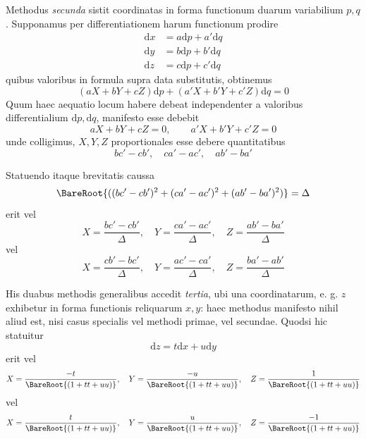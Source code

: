 \par\indent{}%
Methodus \textit{secunda} sistit coordinatas in forma functionum duarum variabilium \(p,q\). Supponamus per differentiationem harum functionum prodire
\[
\begin{aligned}
\mathrm{d}x&=a\mathrm{d}p+a'\mathrm{d}q\\
\mathrm{d}y&=b\mathrm{d}p+b'\mathrm{d}q\\
\mathrm{d}z&=c\mathrm{d}p+c'\mathrm{d}q
\end{aligned}
\]
\noindent quibus valoribus in formula supra data substitutis, obtinemus
\[
(aX+bY+cZ)\mathrm{d}p+(a'X+b'Y+c'Z)\mathrm{d}q=0
\]
\noindent Quum haec aequatio locum habere debeat independenter a valoribus differentialium \(\mathrm{d}p,\mathrm{d}q\), manifesto esse debebit
\[
aX+bY+cZ=0,\qquad a'X+b'Y+c'Z=0
\]
\noindent unde colligimus, \(X,Y,Z\) proportionales esse debere quantitatibus
\[
bc'-cb',\quad ca'-ac',\quad ab'-ba'
\]
\par\indent Statuendo itaque brevitatis caussa
\[
\BareRoot{((bc'-cb')^2+(ca'-ac')^2+(ab'-ba')^2)}=\Delta
\]
\noindent erit vel
\[
X=\frac{bc'-cb'}{\Delta},\quad Y=\frac{ca'-ac'}{\Delta},\quad Z=\frac{ab'-ba'}{\Delta}
\]
\noindent vel
\[
X=\frac{cb'-bc'}{\Delta},\quad Y=\frac{ac'-ca'}{\Delta},\quad Z=\frac{ba'-ab'}{\Delta}
\]
\par\indent His duabus methodis generalibus accedit \textit{tertia}, ubi una coordinatarum, e. g. \(z\) exhibetur in forma functionis reliquarum \(x,y\): haec methodus manifesto nihil aliud est, nisi casus specialis vel methodi primae, vel secundae. Quodsi hic statuitur
\[
\mathrm{d}z=t\mathrm{d}x+u\mathrm{d}y
\]
\noindent erit vel
\[
X=\frac{-t}{\BareRoot{(1+tt+uu)}},\quad Y=\frac{-u}{\BareRoot{(1+tt+uu)}},\quad Z=\frac{1}{\BareRoot{(1+tt+uu)}}
\]
\noindent vel
\[
X=\frac{t}{\BareRoot{(1+tt+uu)}},\quad Y=\frac{u}{\BareRoot{(1+tt+uu)}},\quad Z=\frac{-1}{\BareRoot{(1+tt+uu)}}
\]
